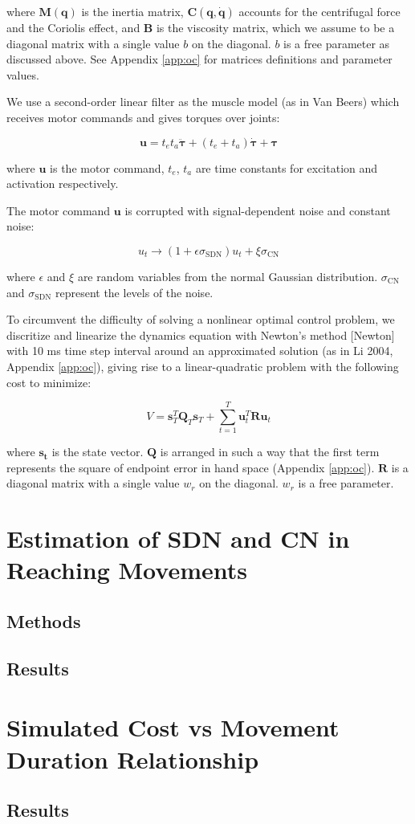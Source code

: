 where $\bm{M}(\bm{q})$ is the inertia matrix, $\bm{C}(\bm{q}, \dot{\bm{q}})$ accounts for the centrifugal force and the Coriolis effect, and $\bm{B}$ is the viscosity matrix, which we assume to be a diagonal matrix with a single value $b$ on the diagonal. $b$ is a free parameter as discussed above. 
See Appendix \ref{app:oc} for matrices definitions and parameter values.

We use a second-order linear filter as the muscle model (as in Van Beers) which receives motor commands and gives torques over joints:

\begin{equation}
	\bm{u} = t_et_a\ddot{\bm{\tau}} + (t_e+t_a)\dot{\bm{\tau}} +\bm{\tau}
\end{equation}

where $\bm{u}$ is the motor command, $t_e$, $t_a$ are time constants for excitation and activation respectively. 

The motor command $\bm{u}$ is corrupted with signal-dependent noise and constant noise:

\begin{equation}
u_t \rightarrow (1 + \epsilon\sigma_{\text{SDN}}) u_t + \xi\sigma_{\text{CN}}
\end{equation}

where $\epsilon$ and $\xi$ are random variables from the normal Gaussian distribution.
$\sigma_{\text{CN}}$ and $\sigma_{\text{SDN}}$ represent the levels of the noise.

To circumvent the difficulty of solving a nonlinear optimal control problem, we discritize and linearize the dynamics equation with Newton's method [Newton] with 10 ms time step interval around an approximated solution (as in Li 2004, Appendix \ref{app:oc}), giving rise to a linear-quadratic problem with the following cost to minimize:

\begin{equation}
V = \bm{s}_T^T\bm{Q}_T\bm{s}_T + \sum_{t=1}^T\bm{u}_t^T\bm{Ru}_t
\end{equation}

where $\bm{s_t}$ is the state vector. 
$\bm{Q}$ is arranged in such a way that the first term represents the square of endpoint error in hand space (Appendix \ref{app:oc}). 
$\bm{R}$ is a diagonal matrix with a single value $w_r$ on the diagonal.
$w_r$ is a free parameter.



\section{Estimation of SDN and CN in Reaching Movements}
\subsection{Methods}
\subsection{Results}
\section{Simulated Cost vs Movement Duration Relationship}
\subsection{Results}


